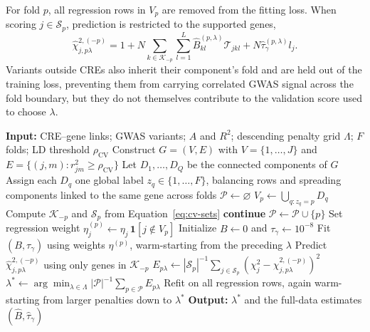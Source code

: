 \documentclass[11pt]{article}
\begin{document}
For fold $p$, all regression rows in $V_p$ are removed from the fitting loss. When scoring $j\in\mathcal{S}_p$, prediction is restricted to the supported genes,
\begin{equation}
\widehat{\chi}_{j,p\lambda}^{2,(-p)}
=1+N\sum_{k\in\mathcal{K}_{-p}}\sum_{l=1}^L\widehat{B}_{kl}^{(p,\lambda)}\mathcal{T}_{jkl}
+N\widehat{\tau}_{\gamma}^{(p,\lambda)}l_j.
\end{equation}
Variants outside CREs also inherit their component's fold and are held out of the training loss, preventing them from carrying correlated GWAS signal across the fold boundary, but they do not themselves contribute to the validation score used to choose $\lambda$.

\begin{algorithm}[H]
\caption{Global LD-component cross-validation for selecting $\lambda$}
\label{alg:cre-cv}
\begin{algorithmic}[1]
\State \textbf{Input:} CRE--gene links; GWAS variants; $A$ and $R^2$; descending penalty grid $\Lambda$; $F$ folds; LD threshold $\rho_{\mathrm{CV}}$
\State Construct $G=(V,E)$ with $V=\{1,\ldots,J\}$ and $E=\{(j,m):r_{jm}^2\ge\rho_{\mathrm{CV}}\}$
\State Let $D_1,\ldots,D_Q$ be the connected components of $G$
\State Assign each $D_q$ one global label $z_q\in\{1,\ldots,F\}$, balancing rows and spreading components linked to the same gene across folds
\State $\mathcal{P}\gets\varnothing$
    \State $V_p\gets\bigcup_{q:z_q=p}D_q$ 
    \State Compute $\mathcal{K}_{-p}$ and $\mathcal{S}_p$ from Equation~\ref{eq:cv-sets}
     \State \textbf{continue} \EndIf
    \State $\mathcal{P}\gets\mathcal{P}\cup\{p\}$
    \State Set regression weight $\eta_j^{(p)}\gets\eta_j\,\mathbf{1}[j\notin V_p]$
    \State Initialize $B\gets 0$ and $\tau_\gamma\gets 10^{-8}$
        \State Fit $(B,\tau_\gamma)$ using weights $\eta^{(p)}$, warm-starting from the preceding $\lambda$
        \State Predict $\widehat{\chi}_{j,p\lambda}^{2,(-p)}$ using only genes in $\mathcal{K}_{-p}$
        \State $E_{p\lambda}\gets |\mathcal{S}_p|^{-1}\sum_{j\in\mathcal{S}_p}(\chi_j^2-\widehat{\chi}_{j,p\lambda}^{2,(-p)})^2$
    \EndFor
\EndFor
\State $\lambda^*\gets\arg\min_{\lambda\in\Lambda}|\mathcal{P}|^{-1}\sum_{p\in\mathcal{P}} E_{p\lambda}$
\State Refit on all regression rows, again warm-starting from larger penalties down to $\lambda^*$
\State \textbf{Output:} $\lambda^*$ and the full-data estimates $(\widehat B,\widehat\tau_\gamma)$
\end{algorithmic}
\end{algorithm}
\end{document}

